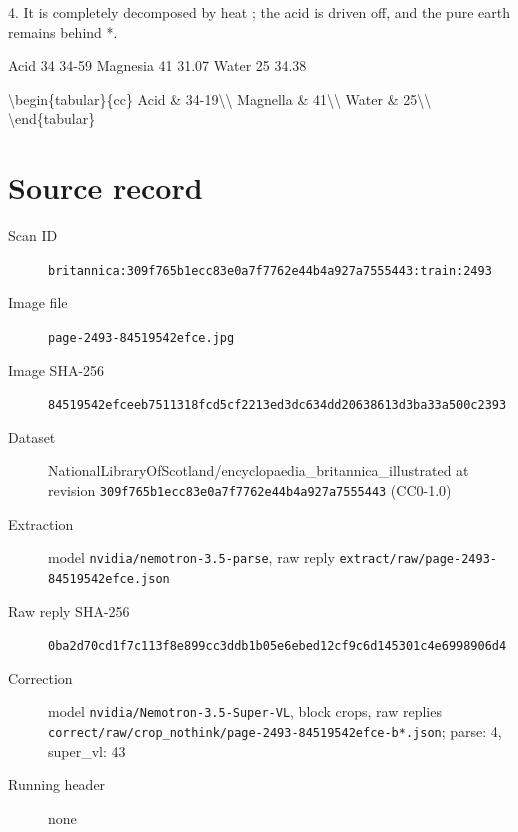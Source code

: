\documentclass{article}
\begin{document}
4. It is completely decomposed by heat ; the acid is driven off, and the pure earth remains behind *.

Acid 34 34-59
Magnesia 41 31.07
Water 25 34.38

\textbackslash{}begin\{tabular\}\{cc\}
Acid \& 34-19\textbackslash{}\textbackslash{}
Magnella \& 41\textbackslash{}\textbackslash{}
Water \& 25\textbackslash{}\textbackslash{}
\textbackslash{}end\{tabular\}


\section*{Source record}
\begin{description}
\item[Scan ID] \texttt{britannica:309f765b1ecc83e0a7f7762e44b4a927a7555443:train:2493}
\item[Image file] \texttt{page-2493-84519542efce.jpg}
\item[Image SHA-256] \texttt{84519542efceeb7511318fcd5cf2213ed3dc634dd20638613d3ba33a500c2393}
\item[Dataset] NationalLibraryOfScotland/encyclopaedia\_britannica\_illustrated at revision \texttt{309f765b1ecc83e0a7f7762e44b4a927a7555443} (CC0-1.0)
\item[Extraction] model \texttt{nvidia/nemotron-3.5-parse}, raw reply \texttt{extract/raw/page-2493-84519542efce.json}
\item[Raw reply SHA-256] \texttt{0ba2d70cd1f7c113f8e899cc3ddb1b05e6ebed12cf9c6d145301c4e6998906d4}
\item[Correction] model \texttt{nvidia/Nemotron-3.5-Super-VL}, block crops, raw replies \texttt{correct/raw/crop\_nothink/page-2493-84519542efce-b*.json}; parse: 4, super\_vl: 43
\item[Running header] none
\end{description}
\end{document}

